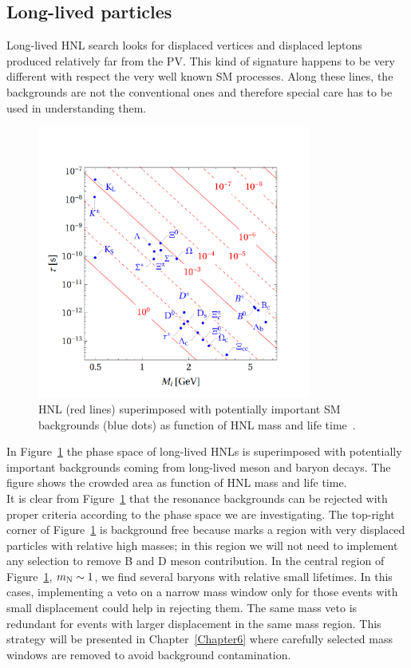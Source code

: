 \subsection{Long-lived particles}\label{sec:c4LLbgk}
Long-lived HNL search looks for displaced
vertices and displaced leptons produced relatively far from the PV.
This kind of signature happens to be very different with respect the
very well known SM processes. Along these lines, the backgrounds
are not the conventional ones and
therefore special care has to be used in understanding them.
\begin{figure}[h!]
\centering
 \includegraphics[clip,trim=0.5cm 0.5cm 2cm 2cm, width=0.80\textwidth]{Figures/c4/resonances.pdf}
  \caption{HNL \mixpar (red lines) superimposed with potentially important SM backgrounds
(blue dots) as function of HNL mass and life time~\cite{Drewes_2020_jan}.}
  \label{fig:c4LLbgk}
\end{figure}


In Figure~\ref{fig:c4LLbgk} the phase space of long-lived HNLs is
superimposed with potentially important backgrounds coming from
long-lived meson and baryon decays. The figure shows the crowded area as function
of HNL mass and life time.\\
It is clear from Figure~\ref{fig:c4LLbgk} that the resonance
backgrounds can be rejected with proper criteria according to
the phase space we are investigating.
The top-right corner of Figure~\ref{fig:c4LLbgk} is
background free because marks a region with very displaced particles
with relative high masses; in this region we will not need to implement
any selection to remove B and D meson contribution. In the central
region of Figure~\ref{fig:c4LLbgk}, $m_\mathrm{N} \sim 1$\GeV, we find several
baryons with relative small lifetimes. In this cases, implementing a 
veto on a narrow mass window only for those events with small
displacement could help in rejecting them. The same mass veto is redundant
for events with larger displacement in the same mass region.
This strategy will be presented in
Chapter~\ref{Chapter6} where carefully selected mass windows are removed
to avoid background contamination.




